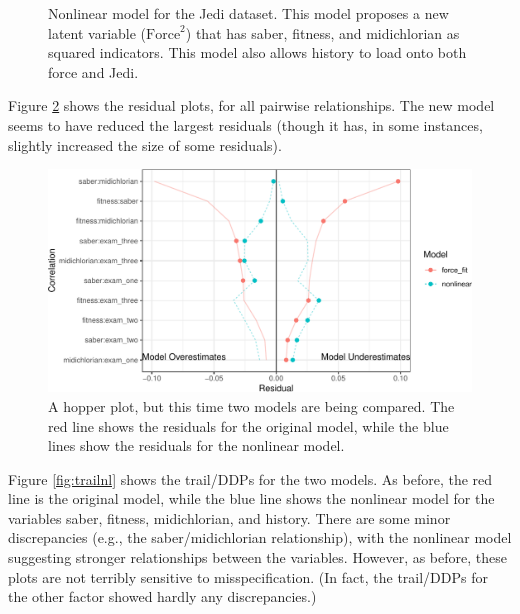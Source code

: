 \documentclass[
  english,
  man]{apa6}
\begin{document}
\begin{figure}
\begin{center}
\caption{Nonlinear model for the Jedi dataset. This model proposes a new latent variable ($\text{Force}^2$) that has saber, fitness, and midichlorian as squared indicators. This model also allows history to load onto both force and Jedi.}
\label{fig:forceNonlin}
\end{center}
\end{figure}

Figure \ref{fig:hopperModcomp} shows the residual plots, for all pairwise relationships. The new model seems to have reduced the largest residuals (though it has, in some instances, slightly increased the size of some residuals).

\begin{figure}

{\centering \includegraphics[width=0.6\linewidth]{flexplavaan_draft_files/figure-latex/hopperModcomp-1} 

}

\caption{A hopper plot, but this time two models are being compared. The red line shows the residuals for the original model, while the blue lines show the residuals for the nonlinear model.}\label{fig:hopperModcomp}
\end{figure}

Figure \ref{fig:trailnl} shows the trail/DDPs for the two models. As before, the red line is the original model, while the blue line shows the nonlinear model for the variables saber, fitness, midichlorian, and history. There are some minor discrepancies (e.g., the saber/midichlorian relationship), with the nonlinear model suggesting stronger relationships between the variables. However, as before, these plots are not terribly sensitive to misspecification. (In fact, the trail/DDPs for the other factor showed hardly any discrepancies.)
\end{document}
